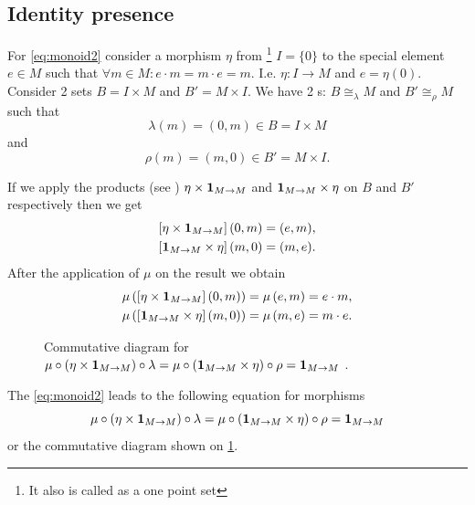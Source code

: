\subsection{Identity presence}
For \eqref{eq:monoid2} consider a morphism $\eta$ from
\footnote{
 It also is called \cite[p.~2]{bib:maclane98} as a one point set
}
$I = \{0\}$ to the special element $e \in M$ such that
$\forall m \in M: e \cdot m = m \cdot e = m$. I.e. $\eta: I \to M$ and
$e = \eta(0)$. Consider 2 sets $B = I \times M$ and $B' = M \times I$. 
We have 2 s: $B \cong_\lambda M$ and $B'
\cong_\rho M$ such that
\[
\lambda(m) = (0, m) \in B = I \times M
\] 
and
\[
\rho(m) = (m, 0) \in B' = M \times I.
\] 

If we apply the products (see ) $\eta \times \mathbf{1}_{ M \to M }$ and
$\mathbf{1}_{ M \to M } \times \eta$ on $B$ and $B'$ respectively then we get
\begin{eqnarray}
\left[\eta \times \mathbf{1}_{ M \to M } \right]\left(0, m\right) = (e, m),
\nonumber \\
\left[\mathbf{1}_{ M \to M } \times \eta \right]\left(m, 0\right) = (m, e).
\nonumber
\end{eqnarray}
After the application of $\mu$ on the result we obtain
\begin{eqnarray}
\mu \left(\left[\eta \times \mathbf{1}_{ M \to M }\right] \left(0, m\right) \right) 
= \mu \left( e, m \right) = e \cdot m,
\nonumber \\
\mu \left(\left[ \mathbf{1}_{ M \to M } \times \eta \right]\left(m, 0\right) \right) = 
\mu \left(m, e \right) = m \cdot e.
\nonumber
\end{eqnarray}
\begin{figure}
  \centering
  \caption{Commutative diagram for $\mu \circ (\eta \times \mathbf{1}_{ M \to M })
    \circ \lambda = \mu \circ (\mathbf{1}_{ M \to M } \times \eta) \circ \rho =
    \mathbf{1}_{ M \to M }$ .} 
  \label{fig:monoid_eta_lambda_rho}
\end{figure}
The \eqref{eq:monoid2} leads to the following equation for morphisms
\[
\mu \circ (\eta \times \mathbf{1}_{ M \to M }) \circ \lambda = 
\mu \circ (\mathbf{1}_{ M \to M } \times \eta) \circ \rho = 
\mathbf{1}_{ M \to M }
\]
or the commutative diagram shown on \cref{fig:monoid_eta_lambda_rho}.

